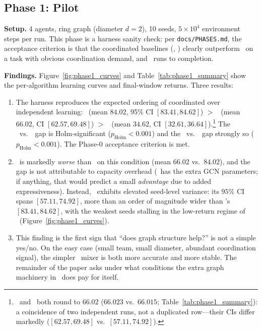 \subsection{Phase 1: Pilot}
\label{sec:results:pilot}

\textbf{Setup.} 4 agents, ring graph (diameter $d=2$), 10 seeds, $5 \times 10^4$
environment steps per run. This phase is a harness sanity check: per
\texttt{docs/PHASES.md}, the acceptance criterion is that the coordinated
baselines (\vdn, \qmix) clearly outperform \iql\ on a task with obvious
coordination demand, and \gnnqmix\ runs to completion.

\textbf{Findings.} Figure~\ref{fig:phase1_curves} and
Table~\ref{tab:phase1_summary} show the per-algorithm learning curves and
final-window returns. Three results:
\begin{enumerate}[leftmargin=*,itemsep=0pt,topsep=2pt]
  \item The harness reproduces the expected ordering of coordinated over
        independent learning: \qmix\ (mean $84.02$, 95\% CI
        $[83.41, 84.62]$) $>$ \vdn\ (mean $66.02$, CI $[62.57, 69.48]$) $>$
        \iql\ (mean $34.62$, CI $[32.61, 36.64]$).\footnote{\vdn\ and \gnnqmix\
        both round to $66.02$ ($66.023$ vs.\ $66.015$;
        Table~\ref{tab:phase1_summary}): a coincidence of two independent runs,
        not a duplicated row---their CIs differ markedly ($[62.57, 69.48]$
        vs.\ $[57.11, 74.92]$).} The \iql\ vs.\ \vdn\ gap
        is Holm-significant ($p_{\text{Holm}} < 0.001$) and the \iql\
        vs.\ \qmix\ gap strongly so ($p_{\text{Holm}} < 0.001$). The
        Phase-0 acceptance criterion is met.
  \item \gnnqmix\ is markedly \emph{worse} than \qmix\ on this condition
        (mean $66.02$ vs.\ $84.02$), and the gap is not attributable to
        capacity overhead (\gnnqmix\ has the extra GCN parameters; if
        anything, that would predict a small \emph{advantage} due to
        added expressiveness). Instead, \gnnqmix\ exhibits elevated
        seed-level variance: its $95\%$ CI spans $[57.11, 74.92]$, more than
        an order of magnitude wider than \qmix's $[83.41, 84.62]$, with the
        weakest seeds stalling in the low-return regime of \iql\
        (Figure~\ref{fig:phase1_curves}).
  \item This finding is the first sign that ``does graph structure
        help?'' is not a simple yes/no. On the easy case (small team,
        small diameter, abundant coordination signal), the simpler
        \qmix\ mixer is both more accurate and more stable. The
        remainder of the paper asks under what conditions the extra
        graph machinery in \gnnqmix\ does pay for itself.
\end{enumerate}


